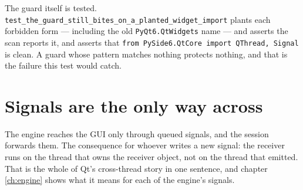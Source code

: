 The guard itself is tested. \texttt{test\_\allowbreak{}the\_\allowbreak{}guard\_\allowbreak{}still\_\allowbreak{}bites\_\allowbreak{}on\_\allowbreak{}a\_\allowbreak{}planted\_\allowbreak{}widget\_\allowbreak{}import}
plants each forbidden form --- including the old \texttt{PyQt6.QtWidgets} name --- and asserts the scan
reports it, and asserts that \texttt{from PySide6.QtCore import QThread, Signal} is clean. A guard
whose pattern matches nothing protects nothing, and that is the failure this test would catch.

\section{Signals are the only way across}

The engine reaches the GUI only through queued signals, and the session forwards them. The consequence
for whoever writes a new signal: the receiver runs on the thread that owns the receiver object, not on
the thread that emitted. That is the whole of Qt's cross-thread story in one sentence, and chapter
\ref{ch:engine} shows what it means for each of the engine's signals.

